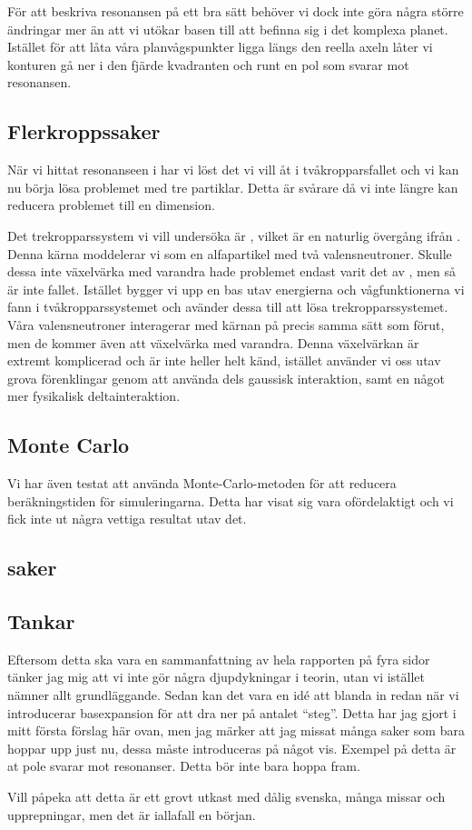 \documentclass[12pt,a4paper]{report}
\begin{document}
För att beskriva resonansen på ett bra sätt behöver vi dock inte göra några större ändringar mer än att vi utökar basen till att befinna sig i det komplexa planet.
Istället för att låta våra planvågspunkter ligga längs den reella axeln låter vi konturen gå ner i den fjärde kvadranten  och runt en pol som svarar mot resonansen.

\subsection{Flerkroppssaker}
När vi hittat resonanseen i  har vi löst det vi vill åt i tvåkropparsfallet och vi kan nu börja lösa problemet med tre partiklar.
Detta är svårare då vi inte längre kan reducera problemet till en dimension.

Det trekropparssystem vi vill undersöka är , vilket är en naturlig övergång ifrån .
Denna kärna moddelerar vi som en alfapartikel med två valensneutroner.
Skulle dessa inte växelvärka med varandra hade problemet endast varit det av , men så är inte fallet.
Istället bygger vi upp en bas utav energierna och vågfunktionerna vi fann i tvåkropparssystemet och avänder dessa till att lösa trekropparssystemet.
Våra valensneutroner interagerar med kärnan på precis samma sätt som förut, men de kommer även att växelvärka med varandra.
Denna växelvärkan är extremt komplicerad och är inte heller helt känd, istället använder vi oss utav grova förenklingar genom att använda dels gaussisk interaktion, samt en något mer fysikalisk deltainteraktion.


\subsection{Monte Carlo}
Vi har även testat att använda Monte-Carlo-metoden för att reducera beräkningstiden för simuleringarna.
Detta har visat sig vara ofördelaktigt och vi fick inte ut några vettiga resultat utav det.

\subsection{saker}

\subsection{Tankar}
Eftersom detta ska vara en sammanfattning av hela rapporten på fyra sidor tänker jag mig att vi inte gör några djupdykningar i teorin, utan vi istället nämner allt grundläggande. Sedan kan det vara en idé att blanda in  redan när vi introducerar basexpansion för att dra ner på antalet ``steg''. Detta har jag gjort i mitt första förslag här ovan, men jag märker att jag missat många saker som bara hoppar upp just nu, dessa måste introduceras på något vis. Exempel på detta är at pole svarar mot resonanser. Detta bör inte bara hoppa fram.

Vill påpeka att detta är ett grovt utkast med dålig svenska, många missar och upprepningar, men det är iallafall en början.
\end{document}
